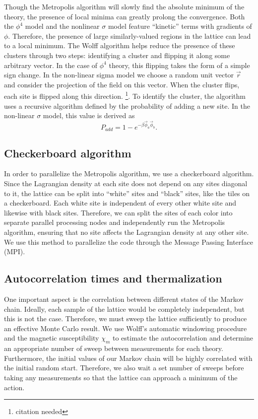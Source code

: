 \documentclass[12pt]{report}
\begin{document}
Though the Metropolis algorithm will slowly find the absolute minimum of the theory, the presence of local minima can greatly prolong the convergence. Both the $\phi^4$ model and the nonlinear $\sigma$ model feature ``kinetic'' terms with gradients of $\phi$. Therefore, the presence of large similarly-valued regions in the lattice can lead to a local minimum. The Wolff algorithm helps reduce the presence of these clusters through two steps: identifying a cluster and flipping it along some arbitrary vector. In the case of $\phi^4$ theory, this flipping takes the form of a simple sign change. In the non-linear sigma model we choose a random unit vector $\vec r$ and consider the projection of the field on this vector. When the cluster flips, each site is flipped along this direction. \footnote{citation needed}. To identify the cluster, the algorithm uses a recursive algorithm defined by the probability of adding a new site. In the non-linear $\sigma$ model, this value is derived as 
\begin{equation}
    P_{add} = 1-e^{- \beta \vec\phi_a\vec\phi_b}.
\end{equation}


\subsection{Checkerboard algorithm}

In order to parallelize the Metropolis algorithm, we use a checkerboard algorithm. Since the Lagrangian density at each site does not depend on any sites diagonal to it, the lattice can be split into ``white'' sites and ``black'' sites, like the tiles on a checkerboard. Each white site is independent of every other white site and likewise with black sites. Therefore, we can split the sites of each color into separate parallel processing nodes and independently run the Metropolis algorithm, ensuring that no site affects the Lagrangian density at any other site. We use this method to parallelize the code through the Message Passing Interface (MPI).

\subsection{Autocorrelation times and thermalization}
One important aspect is the correlation between different states of the Markov chain. Ideally, each sample of the lattice would be completely independent, but this is not the case. Therefore, we must sweep the lattice sufficiently to produce an effective Monte Carlo result. We use Wolff's automatic windowing procedure \cite{wolff2007} and the magnetic susceptibility $\chi_m$ to estimate the autocorrelation and determine an appropriate number of sweep between measurements for each theory. Furthermore, the initial values of our Markov chain will be highly correlated with the initial random start. Therefore, we also wait a set number of sweeps before taking any measurements so that the lattice can approach a minimum of the action.
\end{document}
